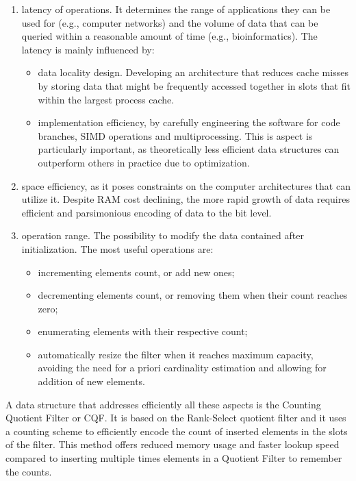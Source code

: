 \begin{enumerate}
	\item latency of \memb operations. It determines the range of applications they can be used for (e.g., computer networks) and the volume of data that can be queried within a reasonable amount of time (e.g., bioinformatics). The latency is mainly influenced by:
	\begin{itemize}
		\item data locality design. Developing an architecture that reduces cache misses by storing data that might be frequently accessed together in slots that fit within the largest process cache.
		\item implementation efficiency, by carefully engineering the software for code branches, SIMD operations and multiprocessing. This is aspect is particularly important, as theoretically less efficient data structures can outperform others in practice due to optimization.
	\end{itemize}
	\item space efficiency, as it poses constraints on the computer architectures that can utilize it. Despite RAM cost declining, the more rapid growth of data requires efficient and parsimonious encoding of data to the bit level.
	\item operation range. The possibility to modify the data contained after initialization. The most useful operations are:
	\begin{itemize}
		\item incrementing elements count, or add new ones; 
		\item decrementing elements count, or removing them when their count reaches zero;
		\item enumerating elements with their respective count;
		\item automatically resize the filter when it reaches maximum capacity, avoiding the need for a priori cardinality estimation and allowing for addition of new elements.
	\end{itemize}
\end{enumerate}
A data structure that addresses efficiently all these aspects is the Counting Quotient Filter or CQF. It is based on the Rank-Select quotient filter and it uses a counting scheme to efficiently encode the count of inserted elements in the slots of the filter. This method offers reduced memory usage and faster lookup speed compared to inserting multiple times elements in a Quotient Filter to remember the counts.
